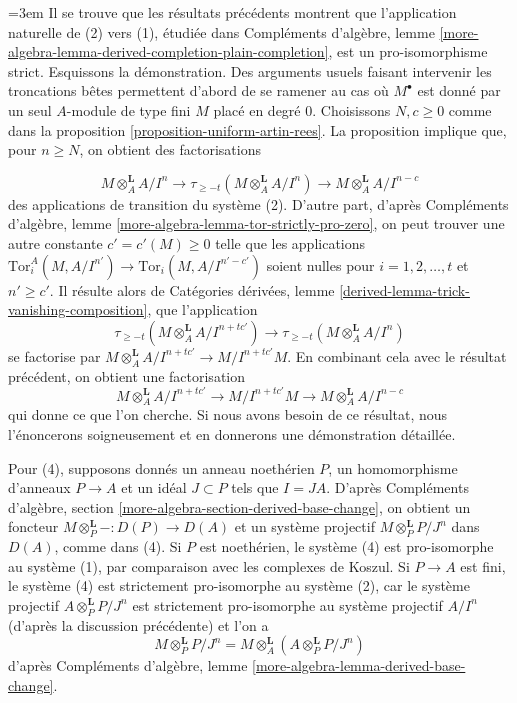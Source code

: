 \begin{remark}
\medskip\noindent
{\emergencystretch=3em
Il se trouve que les résultats précédents montrent que l'application naturelle de (2) vers (1), étudiée dans Compléments d'algèbre, lemme \ref{more-algebra-lemma-derived-completion-plain-completion}, est un pro-isomorphisme strict. Esquissons la démonstration. Des arguments usuels faisant intervenir les troncations bêtes permettent d'abord de se ramener au cas où $M^\bullet$ est donné par un seul $A$-module de type fini $M$ placé en degré $0$. Choisissons $N, c \geq 0$ comme dans la proposition \ref{proposition-uniform-artin-rees}. La proposition implique que, pour $n \geq N$, on obtient des factorisations
\par}
$$
M \otimes_A^\mathbf{L} A/I^n
\to
\tau_{\geq -t}(M \otimes_A^\mathbf{L} A/I^n)
\to
M \otimes_A^\mathbf{L} A/I^{n - c}
$$
des applications de transition du système (2). D'autre part, d'après Compléments d'algèbre, lemme \ref{more-algebra-lemma-tor-strictly-pro-zero}, on peut trouver une autre constante $c' = c'(M) \geq 0$ telle que les applications $\text{Tor}_i^A(M, A/I^{n'}) \to \text{Tor}_i(M, A/I^{n' - c'})$ soient nulles pour $i = 1, 2, \ldots, t$ et $n' \geq c'$. Il résulte alors de Catégories dérivées, lemme \ref{derived-lemma-trick-vanishing-composition}, que l'application
$$
\tau_{\geq -t}(M \otimes_A^\mathbf{L} A/I^{n + tc'})
\to
\tau_{\geq -t}(M \otimes_A^\mathbf{L} A/I^n)
$$
se factorise par $M \otimes_A^\mathbf{L}A/I^{n + tc'} \to M/I^{n + tc'}M$. En combinant cela avec le résultat précédent, on obtient une factorisation
$$
M \otimes_A^\mathbf{L}A/I^{n + tc'} \to M/I^{n + tc'}M
\to M \otimes_A^\mathbf{L} A/I^{n - c}
$$
qui donne ce que l'on cherche. Si nous avons besoin de ce résultat, nous l'énoncerons soigneusement et en donnerons une démonstration détaillée.

\medskip\noindent
Pour (4), supposons donnés un anneau noethérien $P$, un homomorphisme d'anneaux $P \to A$ et un idéal $J \subset P$ tels que $I = JA$. D'après Compléments d'algèbre, section \ref{more-algebra-section-derived-base-change}, on obtient un foncteur $M \otimes_P^\mathbf{L} - : D(P) \to D(A)$ et un système projectif $M \otimes_P^\mathbf{L} P/J^n$ dans $D(A)$, comme dans (4). Si $P$ est noethérien, le système (4) est pro-isomorphe au système (1), par comparaison avec les complexes de Koszul. Si $P \to A$ est fini, le système (4) est strictement pro-isomorphe au système (2), car le système projectif $A \otimes_P^\mathbf{L} P/J^n$ est strictement pro-isomorphe au système projectif $A/I^n$ (d'après la discussion précédente) et l'on a
$$
M \otimes_P^\mathbf{L} P/J^n = M \otimes_A^\mathbf{L}
(A \otimes_P^\mathbf{L} P/J^n)
$$
d'après Compléments d'algèbre, lemme \ref{more-algebra-lemma-derived-base-change}.


\end{remark}
